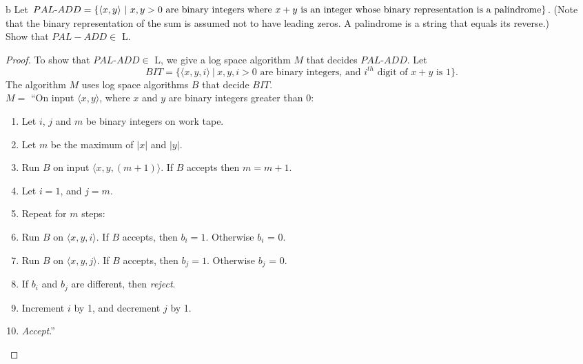 \documentclass[11pt]{article}
\begin{document}
\newpage

\begin{problem}[Part]{b}
Let $PAL\text{-}ADD = \{\langle x, y \rangle \ | \ x, y > 0 \text{ are binary integers where } x + y \text{ is an integer whose } \\ \text{binary representation is a palindrome}\}$. (Note that the binary
representation of the sum is assumed not to have leading zeros. A palindrome is a string that equals its reverse.) \\ Show that $PAL-ADD \in$ L.
\end{problem}

\begin{proof} 
To show that $PAL\text{-}ADD \in$ L, we give a log space algorithm $M$ that decides $PAL\text{-}ADD$. Let
\[
BIT = \{\langle x, y, i \rangle \ | \ x, y, i > 0 \text{ are binary integers, and } i^{th} \text{ digit of } x + y \text{ is } 1\}.
\]
The algorithm $M$ uses log space algorithms $B$ that decide $BIT$. \\

$M =$ \textquotedblleft On input $\langle x, y \rangle$, where $x$ and $y$ are binary integers greater than 0:
\begin{enumerate}
\item Let $i$, $j$ and $m$ be binary integers on work tape.
\item Let $m$ be the maximum of $|x|$ and $|y|$.
\item Run $B$ on input $\langle x, y, (m+1) \rangle$. If $B$ accepts then $m = m + 1$.
\item Let $i = 1$, and $j = m$.
\item Repeat for $m$ steps:
\item \hspace*{0.5cm} Run $B$ on $\langle x, y, i\rangle$. If $B$ accepts, then $b_i = 1$. Otherwise $b_i$ = 0.
\item \hspace*{0.5cm} Run $B$ on $\langle x, y, j\rangle$. If $B$ accepts, then $b_j = 1$. Otherwise $b_j$ = 0.
\item \hspace*{0.5cm} If $b_i$ and $b_j$ are different, then \textit{reject}.
\item \hspace*{0.5cm} Increment $i$ by 1, and decrement $j$ by 1.
\item \textit{Accept}.\textquotedblright \\
\end{enumerate}


\end{proof}
\end{document}
